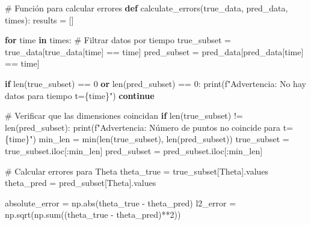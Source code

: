 \documentclass[
  spanish,
  us-letterpaper,
  DIV=11,
  numbers=noendperiod]{scrreprt}
\newenvironment{Shaded}{\begin{snugshade}}{\end{snugshade}}
\newcommand{\BuiltInTok}[1]{\textcolor[rgb]{0.00,0.23,0.31}{#1}}
\newcommand{\CommentTok}[1]{\textcolor[rgb]{0.37,0.37,0.37}{#1}}
\newcommand{\ControlFlowTok}[1]{\textcolor[rgb]{0.00,0.23,0.31}{\textbf{#1}}}
\newcommand{\DecValTok}[1]{\textcolor[rgb]{0.68,0.00,0.00}{#1}}
\newcommand{\KeywordTok}[1]{\textcolor[rgb]{0.00,0.23,0.31}{\textbf{#1}}}
\newcommand{\NormalTok}[1]{\textcolor[rgb]{0.00,0.23,0.31}{#1}}
\newcommand{\OperatorTok}[1]{\textcolor[rgb]{0.37,0.37,0.37}{#1}}
\newcommand{\SpecialCharTok}[1]{\textcolor[rgb]{0.37,0.37,0.37}{#1}}
\newcommand{\SpecialStringTok}[1]{\textcolor[rgb]{0.13,0.47,0.30}{#1}}
\newcommand{\StringTok}[1]{\textcolor[rgb]{0.13,0.47,0.30}{#1}}
\theoremstyle{plain}
\theoremstyle{definition}
\theoremstyle{remark}
\begin{document}
\begin{Shaded}
\begin{Highlighting}[]
\CommentTok{\# Función para calcular errores}
\KeywordTok{def}\NormalTok{ calculate\_errors(true\_data, pred\_data, times):}
\NormalTok{    results }\OperatorTok{=}\NormalTok{ []}
    
    \ControlFlowTok{for}\NormalTok{ time }\KeywordTok{in}\NormalTok{ times:}
        \CommentTok{\# Filtrar datos por tiempo}
\NormalTok{        true\_subset }\OperatorTok{=}\NormalTok{ true\_data[true\_data[}\StringTok{\textquotesingle{}time\textquotesingle{}}\NormalTok{] }\OperatorTok{==}\NormalTok{ time]}
\NormalTok{        pred\_subset }\OperatorTok{=}\NormalTok{ pred\_data[pred\_data[}\StringTok{\textquotesingle{}time\textquotesingle{}}\NormalTok{] }\OperatorTok{==}\NormalTok{ time]}
        
        \ControlFlowTok{if} \BuiltInTok{len}\NormalTok{(true\_subset) }\OperatorTok{==} \DecValTok{0} \KeywordTok{or} \BuiltInTok{len}\NormalTok{(pred\_subset) }\OperatorTok{==} \DecValTok{0}\NormalTok{:}
            \BuiltInTok{print}\NormalTok{(}\SpecialStringTok{f"Advertencia: No hay datos para tiempo t=}\SpecialCharTok{\{}\NormalTok{time}\SpecialCharTok{\}}\SpecialStringTok{"}\NormalTok{)}
            \ControlFlowTok{continue}
        
        \CommentTok{\# Verificar que las dimensiones coincidan}
        \ControlFlowTok{if} \BuiltInTok{len}\NormalTok{(true\_subset) }\OperatorTok{!=} \BuiltInTok{len}\NormalTok{(pred\_subset):}
            \BuiltInTok{print}\NormalTok{(}\SpecialStringTok{f"Advertencia: Número de puntos no coincide para t=}\SpecialCharTok{\{}\NormalTok{time}\SpecialCharTok{\}}\SpecialStringTok{"}\NormalTok{)}
\NormalTok{            min\_len }\OperatorTok{=} \BuiltInTok{min}\NormalTok{(}\BuiltInTok{len}\NormalTok{(true\_subset), }\BuiltInTok{len}\NormalTok{(pred\_subset))}
\NormalTok{            true\_subset }\OperatorTok{=}\NormalTok{ true\_subset.iloc[:min\_len]}
\NormalTok{            pred\_subset }\OperatorTok{=}\NormalTok{ pred\_subset.iloc[:min\_len]}
        
        \CommentTok{\# Calcular errores para Theta}
\NormalTok{        theta\_true }\OperatorTok{=}\NormalTok{ true\_subset[}\StringTok{\textquotesingle{}Theta\textquotesingle{}}\NormalTok{].values}
\NormalTok{        theta\_pred }\OperatorTok{=}\NormalTok{ pred\_subset[}\StringTok{\textquotesingle{}Theta\textquotesingle{}}\NormalTok{].values}
        
\NormalTok{        absolute\_error }\OperatorTok{=}\NormalTok{ np.}\BuiltInTok{abs}\NormalTok{(theta\_true }\OperatorTok{{-}}\NormalTok{ theta\_pred)}
\NormalTok{        l2\_error }\OperatorTok{=}\NormalTok{ np.sqrt(np.}\BuiltInTok{sum}\NormalTok{((theta\_true }\OperatorTok{{-}}\NormalTok{ theta\_pred)}\OperatorTok{**}\DecValTok{2}\NormalTok{))}
        

\end{Highlighting}
\end{Shaded}
\end{document}
